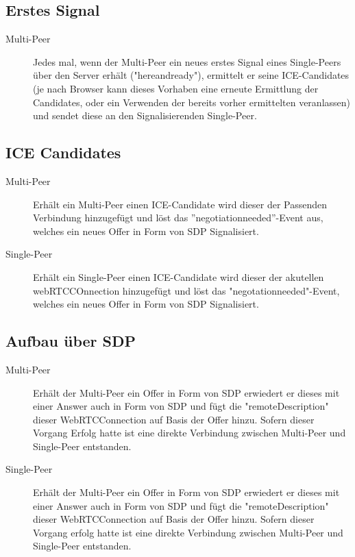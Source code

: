 \subsection{Erstes Signal}
\begin{description}
\item[Multi-Peer]
Jedes mal, wenn der Multi-Peer ein neues erstes Signal eines Single-Peers über 
den Server erhält ("hereandready"), ermittelt er seine ICE-Candidates (je nach Browser kann dieses Vorhaben eine erneute Ermittlung der Candidates, oder ein Verwenden der bereits vorher ermittelten veranlassen) und sendet 
diese an den Signalisierenden Single-Peer.
\end{description}



\subsection{ICE Candidates}
\begin{description}
\item[Multi-Peer]
Erhält ein Multi-Peer einen ICE-Candidate wird dieser der Passenden Verbindung 
hinzugefügt und löst das ''negotiationneeded''-Event aus, welches ein neues Offer 
in Form von SDP Signalisiert.

\item[Single-Peer]
Erhält ein Single-Peer einen ICE-Candidate wird dieser der akutellen 
webRTCCOnnection hinzugefügt und löst das "negotationneeded"-Event, welches ein 
neues Offer in Form von SDP Signalisiert.
\end{description}



\subsection{Aufbau über SDP}
\begin{description}
\item[Multi-Peer]
Erhält der Multi-Peer ein Offer in Form von SDP erwiedert er dieses mit einer 
Answer auch in Form von SDP und fügt die "remoteDescription" dieser 
WebRTCConnection auf Basis der Offer hinzu. Sofern dieser Vorgang Erfolg hatte 
ist eine direkte Verbindung zwischen Multi-Peer und Single-Peer entstanden.

\item[Single-Peer]
Erhält der Multi-Peer ein Offer in Form von SDP erwiedert er dieses mit einer 
Answer auch in Form von SDP und fügt die "remoteDescription" dieser 
WebRTCConnection auf Basis der Offer hinzu. Sofern dieser Vorgang erfolg hatte 
ist eine direkte Verbindung zwischen Multi-Peer und Single-Peer entstanden.
\end{description}



